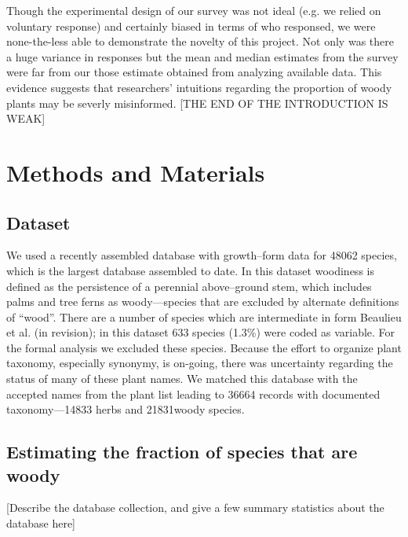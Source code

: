 \documentclass[12pt]{article}
\begin{document}
Though the experimental design of our survey was not ideal (e.g. we relied on voluntary response) and certainly biased in terms of who responsed, we were none-the-less able to demonstrate the novelty of this project. Not only was there a huge variance in responses but the mean and median estimates from the survey were far from our those estimate obtained from analyzing available data. This evidence suggests that researchers' intuitions regarding the proportion of woody plants may be severly misinformed. [THE END OF THE INTRODUCTION IS WEAK]

\section{Methods and Materials}

\subsection{Dataset}

We used a recently assembled database with growth--form data for 48062 species, which is the largest database assembled to date.  In this dataset woodiness is defined as the persistence of a perennial above--ground stem, which includes palms and tree ferns as woody---species that are excluded by alternate definitions of ``wood''.  There are a number of species which are intermediate in form Beaulieu et al. (in revision); in this dataset 633 species (1.3\%) were coded as variable.  For the formal analysis we excluded these species.  Because the effort to organize plant taxonomy, especially synonymy, is on-going, there was uncertainty regarding the status of many of these plant names.  We matched this database with the accepted names from the plant list leading to 36664 records with documented taxonomy---14833 herbs and 21831woody species.  


\subsection{Estimating the fraction of species that are woody}


[Describe the database collection, and give a few summary statistics
about the database here]
\end{document}
